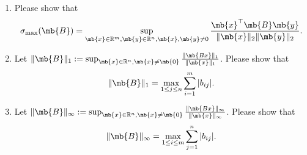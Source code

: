 \begin{exercise}
\begin{enumerate}
\begin{enumerate}
				\item Please show that
					\begin{align*}
						\sigma_{\max}(\mb{B})=\sup_{\mb{x}\in\mathbb{R}^m, \mb{y}\in\mathbb{R}^n, \mb{x},\mb{y}\not=0}\frac{\mb{x}^\top \mb{B}\mb{y}}{\|\mb{x}\|_2\|\mb{y}\|_2}.
					\end{align*}

				\item Let $\|\mb{B}\|_1:=\sup_{\mb{x}\in\mathbb{R}^n, \mb{x}\not=\mb{0}}\frac{\|\mb{Bx}\|_1}{\|\mb{x}\|_1}$. Please show that
					\begin{align*}
						\|\mb{B}\|_1=\max_{1\le j\le n}\sum_{i=1}^m|b_{ij}|.
					\end{align*}

				\item Let $\|\mb{B}\|_\infty:=\sup_{\mb{x}\in\mathbb{R}^n, \mb{x}\not=\mb{0}}\frac{\|\mb{Bx}\|_\infty}{\|\mb{x}\|_\infty}$. Please show that
					\begin{align*}
						\|\mb{B}\|_\infty=\max_{1\le i\le m}\sum_{j=1}^n|b_{ij}|.
					\end{align*}
			\end{enumerate}


\end{enumerate}
\end{exercise}
